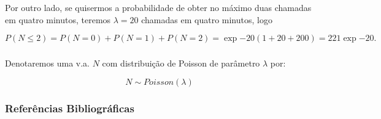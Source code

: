 \documentclass[14pt,aspectratio=1610]{beamer}
\begin{document}
\begin{frame}{}
\frametitle{}
\begin{block}{}
\justifying
Por outro lado, se quisermos a probabilidade de obter no máximo duas chamadas
em quatro minutos, teremos $\lambda=20$ chamadas em quatro minutos, logo

$$P(N\leq 2)=P(N=0)+P(N=1)+P(N=2)=\exp{-20}(1+20+200)=221\exp{-20}.$$

\end{block}
\end{frame}

\begin{frame}{}
\frametitle{}
\begin{block}{}
\justifying
Denotaremos uma v.a. $N$ com distribuição de Poisson de parâmetro $\lambda$ por:

$$N\sim Poisson(\lambda)$$

\end{block}
\end{frame}


\begin{frame}{}
\frametitle{Referências Bibliográficas}

\end{frame}
\end{document}
